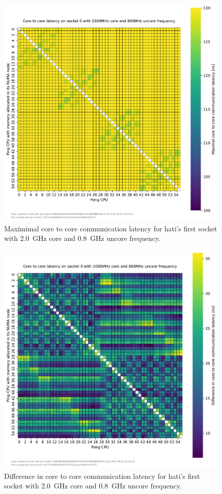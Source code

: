 \begin{figure}[]
    \centering
    \includegraphics[width=\columnwidth]{fig/core-to-core-latency/core-to-core-heatmap-max-2000-800.pdf}
    \caption{Maximimal core to core communication latency for hati's first socket with \SI{2.0}{\GHz} core and \SI{0.8}{\GHz} uncore frequency.}
\end{figure}
\begin{figure}[]
    \centering
    \includegraphics[width=\columnwidth]{fig/core-to-core-latency/core-to-core-heatmap-diff-2000-800.pdf}
    \caption{Difference in core to core communication latency for hati's first socket with \SI{2.0}{\GHz} core and \SI{0.8}{\GHz} uncore frequency.}
\end{figure}

